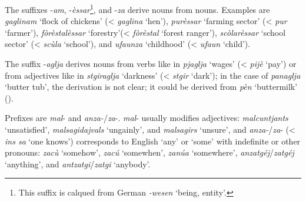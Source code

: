 The suffixes -\textit{am}, -\textit{èssar}\footnote{This suffix is calqued from German \textit{-wesen} `being, entity'.}, and -\textit{za} derive nouns from nouns. Examples are \textit{gaglinam} `flock of chickens' (< \textit{gaglina} `hen'), \textit{purèssar} `farming sector' (< \textit{pur} `farmer'), \textit{fòrèstalèssar} `forestry'(< \textit{fòrèstal} `forest ranger'), \textit{scòlarèssar} `school sector' (< \textit{scùla} `school'), and \textit{ufaunza} `childhood' (< \textit{ufaun} `child'). 

The suffix -\textit{aglja} derives nouns from verbs like in \textit{pjaglja} `wages' (< \textit{pijè} `pay') or from adjectives like in \textit{stgiraglja} `darkness' (< \textit{stgir} `dark'); in the case of \textit{panaglja} `butter tub', the derivation is not clear; it could be derived from \textit{pèn} `buttermilk' (\citet[777]{Decurtins2012}).

Prefixes are \textit{mal}- and \textit{anza-}/\textit{za}-.  \textit{mal}- usually modifies adjectives: \textit{malcuntjants} `unsatisfied', \textit{malsagidajvals} `ungainly', and \textit{malsagirs} `unsure', and \textit{anza-}/\textit{za}- (< \textit{ins sa} `one knows')  corresponds to English `any' or `some' with indefinite or other pronouns: \textit{zacù} `somehow', \textit{zacú} `somewhen', \textit{zanúa} `somewhere', \textit{anzatgéj}/\textit{zatgéj} `anything', and \textit{antzatgi}/\textit{zatgi} `anybody'.

